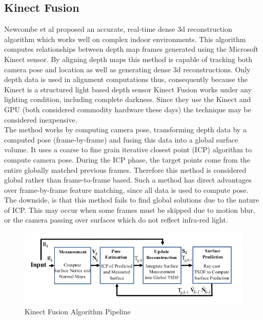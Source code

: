 \subsection{Kinect Fusion}

Newcombe et al \cite{Newcombe11Kinectfusion} proposed an accurate, real-time dense 3d reconstruction algorithm which works well on complex indoor environments. This algorithm computes relationships between depth map frames generated using the Microsoft Kinect \cite{Zhang12Microsoft} sensor. By aligning depth maps this method is capable of tracking both camera pose and location as well as generating dense 3d reconstructions. Only depth data is used in alignment computations thus, consequently because the Kinect is a structured light based depth sensor Kinect Fusion works under any lighting condition, including complete darkness. Since they use the Kinect and GPU (both considered commodity hardware these days) the technique may be considered inexpensive. \\

The method works by computing camera pose, transforming depth data by a computed pose (frame-by-frame) and fusing this data into a global surface volume. It uses a coarse to fine grain iterative closest point (ICP) algorithm to compute camera pose. During the ICP phase, the target points come from the entire globally matched previous frames. Therefore this method is considered global rather than frame-to-frame based. Such a method has direct advantages over frame-by-frame feature matching, since all data is used to compute pose. The downside, is that this method fails to find global solutions due to the nature of ICP. This may occur when some frames must be skipped due to motion blur, or the camera passing over surfaces which do not reflect infra-red light. \\

\begin{figure}[!h]
\centering
\includegraphics[width=12cm]{images/ch1/Newcombe11KinectFusion1}
\caption{Kinect Fusion Algorithm Pipeline \cite{Newcombe11Kinectfusion}}
\label{KFusionPipeline}
\end{figure}

